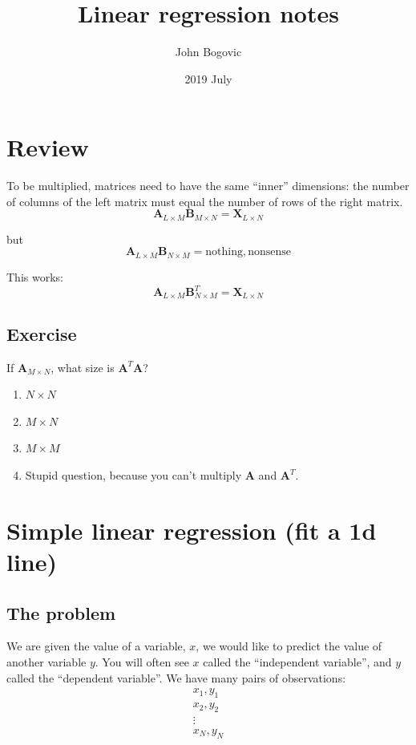 \documentclass[11pt]{article}
\title{Linear regression notes}
\author{John Bogovic}
\date{2019 July}
\newcommand\amtx{\boldsymbol{A}}
\newcommand\bmtx{\boldsymbol{B}}
\newcommand\xmtx{\boldsymbol{X}}
\begin{document}
\maketitle

\section{ Review }

To be multiplied, matrices need to have the same ``inner'' dimensions:
the number of columns of the left matrix must equal the number of rows
of the right matrix.
\begin{equation}
    \amtx_{L \times M } \bmtx_{M \times N} = \xmtx_{L \times N }
\end{equation}

but 
\begin{equation}
    \amtx_{L \times M } \bmtx_{N \times M} = \mathrm{ nothing, nonsense }
\end{equation}

This works:
\begin{equation}
    \amtx_{L \times M } \bmtx_{N \times M}^T =  \xmtx_{L \times N }
\end{equation}

\subsection{ Exercise }

If $\amtx_{M \times N}$, what size is $\amtx^T \amtx$?
\begin{enumerate}
    \item $N \times N$
    \item $M \times N$
    \item $M \times M$
    \item Stupid question, because you can't multiply $\amtx$ and
        $\amtx^T$.
\end{enumerate}


\section{ Simple linear regression (fit a 1d line)}

\subsection{The problem}

We are given the value of a variable, $x$, we would like to predict
the value of another variable $y$.  You will often see $x$ called the
``independent variable'', and $y$ called the ``dependent variable''.
We have many pairs of observations:
\begin{equation}
    \begin{array}{l}
    x_1, y_1 \\
    x_2, y_2 \\
    \vdots \\
    x_N, y_N \\
    \end{array}
\end{equation}
\end{document}
